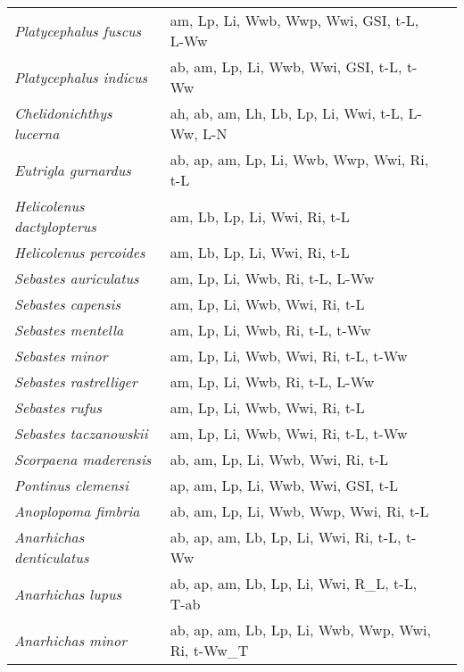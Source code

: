 {\begin{longtable}[c]{p{3.5cm}p{5.5cm}p{5.5cm}}
\emph{Platycephalus fuscus} &  am, Lp, Li, Wwb, Wwp, Wwi, GSI, t-L, L-Ww & \citet{GrayBern2008,HickKopf2015} \\
\emph{Platycephalus indicus} &  ab, am, Lp, Li, Wwb, Wwi, GSI, t-L, t-Ww & \citet{MasuOzaw2000} \\
\emph{Chelidonichthys lucerna} &  ah, ab, am, Lh, Lb, Lp, Li, Wwi, t-L, L-Ww, L-N & \citet{DulcGrub2001,IsmeIsme2004} \\
\emph{Eutrigla gurnardus} &  ab, ap, am, Lp, Li, Wwb, Wwp, Wwi, Ri, t-L & \citet{Magn2007} \\
\emph{Helicolenus dactylopterus} &  am, Lb, Lp, Li, Wwi, Ri, t-L & \citet{AllaLora2000,MunkNiel2005} \\
\emph{Helicolenus percoides} &  am, Lb, Lp, Li, Wwi, Ri, t-L & \citet{PaulHorn2009} \\
\emph{Sebastes auriculatus} &  am, Lp, Li, Wwb, Ri, t-L, L-Ww & \citet{LoveJohn1998} \\
\emph{Sebastes capensis} &  am, Lp, Li, Wwb, Wwi, Ri, t-L & \citet{AndrHech1996} \\
\emph{Sebastes mentella} &  am, Lp, Li, Wwb, Ri, t-L, t-Ww & \citet{BakaMeln2008,SaboDomi2015} \\
\emph{Sebastes minor} &  am, Lp, Li, Wwb, Wwi, Ri, t-L, t-Ww & \citet{Kolp2006} \\
\emph{Sebastes rastrelliger} &  am, Lp, Li, Wwb, Ri, t-L, L-Ww & \citet{LoveJohn1998} \\
\emph{Sebastes rufus} &  am, Lp, Li, Wwb, Wwi, Ri, t-L & \citet{WattKlin2006} \\
\emph{Sebastes taczanowskii} &  am, Lp, Li, Wwb, Wwi, Ri, t-L, t-Ww & \citet{Kolp2006} \\
\emph{Scorpaena maderensis} &  ab, am, Lp, Li, Wwb, Wwi, Ri, t-L & \citet{MesaMesa2005} \\
\emph{Pontinus clemensi} &  ap, am, Lp, Li, Wwb, Wwi, GSI, t-L & \citet{JarrAndr2018} \\
\emph{Anoplopoma fimbria} &  ab, am, Lp, Li, Wwb, Wwp, Wwi, Ri, t-L & \citet{ClarJens1999,AldeJens1988,HeadKell2014} \\
\emph{Anarhichas denticulatus} &  ab, ap, am, Lb, Lp, Li, Wwi, Ri, t-L, t-Ww & \citet{ShevJoha2011,WienJoha2011,MunkNiel2005,Andr1954} \\
\emph{Anarhichas lupus} &  ab, ap, am, Lb, Lp, Li, Wwi, R\_L, t-L, T-ab & \citet{PavlMoks1995,NelsRoss1992} \\
\emph{Anarhichas minor} &  ab, ap, am, Lb, Lp, Li, Wwb, Wwp, Wwi, Ri, t-Ww\_T & \citet{ShevJoha2011,ImslFoss2006} \\

\end{longtable}}
